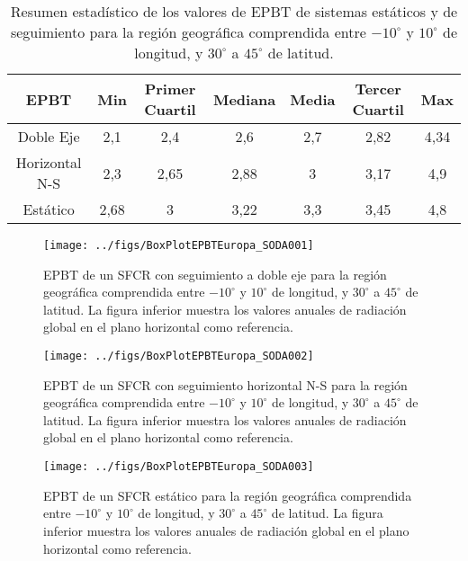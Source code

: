 \begin{table}[p]

  \caption{\label{tab:ResultadosLCA}Resumen estadístico de los valores
    de EPBT de sistemas estáticos y de seguimiento para la región
    geográfica comprendida entre $-10^{\circ}$ y $10^{\circ}$ de
    longitud, y $30^{\circ}$ a $45^{\circ}$ de latitud.}


  \centering{}%
  \begin{tabular}{ccccccc}
    \toprule 
    EPBT & Min & Primer Cuartil & Mediana & Media & Tercer Cuartil & Max\tabularnewline
    \midrule 
    Doble Eje & 2,1 & 2,4 & 2,6 & 2,7 & 2,82 & 4,34\tabularnewline
    \midrule 
    Horizontal N-S & 2,3 & 2,65 & 2,88 & 3 & 3,17 & 4,9\tabularnewline
    \midrule 
    Estático & 2,68 & 3 & 3,22 & 3,3 & 3,45 & 4,8\tabularnewline
    \bottomrule
  \end{tabular}
\end{table}



\begin{figure}[p]
\begin{centering}
\texttt{[image: ../figs/BoxPlotEPBTEuropa\_SODA001]}
\par\end{centering}

\caption{\label{EPBT2xBoxPlot}EPBT de un SFCR con seguimiento a doble
  eje para la región geográfica comprendida entre $-10^{\circ}$ y
  $10^{\circ}$ de longitud, y $30^{\circ}$ a $45^{\circ}$ de latitud.
  La figura inferior muestra los valores anuales de radiación global
  en el plano horizontal como referencia.}
\end{figure}


\begin{figure}[p]
\begin{centering}
\texttt{[image: ../figs/BoxPlotEPBTEuropa\_SODA002]}
\par\end{centering}

\caption{\label{EPBTHorizBoxPlot}EPBT de un SFCR con seguimiento
  horizontal N-S para la región geográfica comprendida entre
  $-10^{\circ}$ y $10^{\circ}$ de longitud, y $30^{\circ}$ a
  $45^{\circ}$ de latitud.  La figura inferior muestra los valores
  anuales de radiación global en el plano horizontal como referencia.}
\end{figure}


\begin{figure}[p]
\begin{centering}
\texttt{[image: ../figs/BoxPlotEPBTEuropa\_SODA003]}
\par\end{centering}

\caption{\label{EPBTEstBoxPlot}EPBT de un SFCR estático para la región
  geográfica comprendida entre $-10^{\circ}$ y $10^{\circ}$ de
  longitud, y $30^{\circ}$ a $45^{\circ}$ de latitud.  La figura
  inferior muestra los valores anuales de radiación global en el plano
  horizontal como referencia.}
\end{figure}



